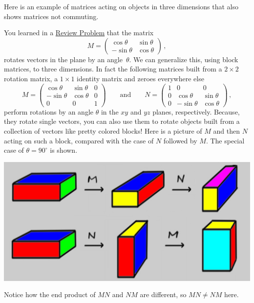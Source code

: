 Here is an example of matrices acting on objects in three dimensions that also shows matrices not commuting.
\begin{example}
You learned in a \hyperlink{rotationprob}{Review Problem} that the matrix
\[M=\begin{pmatrix}\cos\theta & \sin\theta \\ -\sin \theta & \cos\theta\end{pmatrix}\, ,\]
rotates vectors in the plane by an angle~$\theta$. 
We can generalize this, using block matrices, to three dimensions.
In fact the following matrices built from a $2\times 2$ rotation matrix, a $1\times 1$ identity matrix and zeroes everywhere else
\[
M=\begin{pmatrix}\cos\theta & \sin\theta &0\\ -\sin \theta & \cos\theta&0\\0&0&1\end{pmatrix}\qquad\mbox{and}\qquad
N=\begin{pmatrix}1&0&0\\0&\cos\theta & \sin\theta \\ 0&-\sin \theta & \cos\theta\end{pmatrix}\, ,
\]
perform rotations by an angle $\theta$ in the $xy$ and $yz$ planes, respectively. Because, they rotate single vectors, you can also use them to rotate objects built from a collection of vectors like pretty colored blocks! Here is a picture of $M$ and then $N$ acting on such a block, compared with the case of $N$ followed by $M$. The special case of $\theta=90^\circ$ is shown.
\begin{center}
\includegraphics[scale=.3]{MNNM.jpg}
\end{center}
Notice how the end product of $MN$ and $NM$ are different, so $MN\neq NM$ here.
\end{example}



